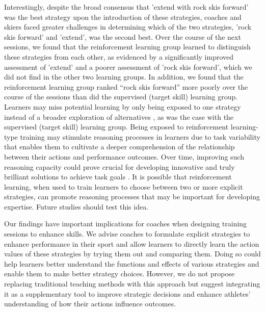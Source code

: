 \documentclass[pdflatex,sn-nature]{sn-jnl}%
\theoremstyle{thmstyleone}%
\theoremstyle{thmstyletwo}%
\theoremstyle{thmstylethree}%
\begin{document}
Interestingly, despite the broad consensus that 'extend with rock skis forward' was the best strategy upon the introduction of these strategies, coaches and skiers faced greater challenges in determining which of the two strategies, 'rock skis forward' and 'extend', was the second best. Over the course of the next sessions, we found that the reinforcement learning group learned to distinguish these strategies from each other, as evidenced by a significantly improved assessment of 'extend' and a poorer assessment of 'rock skis forward', which we did not find in the other two learning groups. In addition, we found that the reinforcement learning group ranked “rock skis forward” more poorly over the course of the sessions than did the supervised (target skill) learning group. Learners may miss potential learning by only being exposed to one strategy instead of a broader exploration of alternatives \cite{shea_context_1983, fromer_come_2016, shea_contextual_1979}, as was the case with the supervised (target skill) learning group. Being exposed to reinforcement learning-type training may stimulate reasoning processes in learners due to task variability that enables them to cultivate a deeper comprehension of the relationship between their actions and performance outcomes. Over time, improving such reasoning capacity could prove crucial for developing innovative and truly brilliant solutions to achieve task goals  \cite{ericsson_scientific_1998}. It is possible that reinforcement learning, when used to train learners to choose between two or more explicit strategies, can promote reasoning processes that may be important for developing expertise. Future studies should test this idea.

Our findings have important implications for coaches when designing training sessions to enhance skills. We advise coaches to formulate explicit strategies to enhance performance in their sport and allow learners to directly learn the action values of these strategies by trying them out and comparing them. Doing so could help learners better understand the functions and effects of various strategies and enable them to make better strategy choices. However, we do not propose replacing traditional teaching methods with this approach but suggest integrating it as a supplementary tool to improve strategic decisions and enhance athletes’ understanding of how their actions influence outcomes. 
\end{document}
